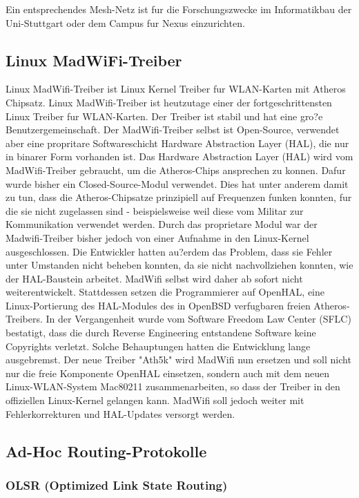 Ein entsprechendes Mesh-Netz ist fur die Forschungszwecke im Informatikbau der Uni-Stuttgart oder dem Campus fur Nexus einzurichten.


\subsection{Linux MadWiFi-Treiber}

Linux MadWifi-Treiber ist Linux Kernel Treiber fur WLAN-Karten mit
Atheros Chipsatz. Linux MadWifi-Treiber ist heutzutage einer der
fortgeschrittensten Linux Treiber fur WLAN-Karten. Der Treiber ist
stabil und hat eine gro?e Benutzergemeinschaft. Der MadWifi-Treiber
selbst ist Open-Source, verwendet aber eine propritare Softwareschicht
Hardware Abstraction Layer (HAL), die nur in binarer Form vorhanden
ist.   Das Hardware Abstraction Layer (HAL) wird vom MadWifi-Treiber
gebraucht, um die Atheros-Chips ansprechen zu konnen. Dafur wurde bisher
ein Closed-Source-Modul verwendet. Dies hat unter anderem damit zu tun,
dass die Atheros-Chipsatze prinzipiell auf Frequenzen funken konnten,
fur die sie nicht zugelassen sind - beispielsweise weil diese vom
Militar zur Kommunikation verwendet werden.   Durch das proprietare
Modul war der Madwifi-Treiber bisher jedoch von einer Aufnahme in den
Linux-Kernel ausgeschlossen. Die Entwickler hatten au?erdem das Problem,
dass sie Fehler unter Umstanden nicht beheben konnten, da sie nicht
nachvollziehen konnten, wie der HAL-Baustein arbeitet.   MadWifi
selbst wird daher ab sofort nicht weiterentwickelt. Stattdessen
setzen die Programmierer auf OpenHAL, eine Linux-Portierung des
HAL-Modules des in OpenBSD verfugbaren freien Atheros-Treibers. In der
Vergangenheit wurde vom Software Freedom Law Center (SFLC) bestatigt,
dass die durch Reverse Engineering entstandene Software keine Copyrights
verletzt. Solche Behauptungen hatten die Entwicklung lange ausgebremst. 
 Der neue Treiber "Ath5k" wird MadWifi nun ersetzen und soll nicht
nur die freie Komponente OpenHAL einsetzen, sondern auch mit dem neuen
Linux-WLAN-System Mac80211 zusammenarbeiten, so dass der Treiber in den
offiziellen Linux-Kernel gelangen kann. MadWifi soll jedoch weiter mit
Fehlerkorrekturen und HAL-Updates versorgt werden. 

\subsection{Ad-Hoc Routing-Protokolle}

\subsubsection{OLSR (Optimized Link State Routing)}

